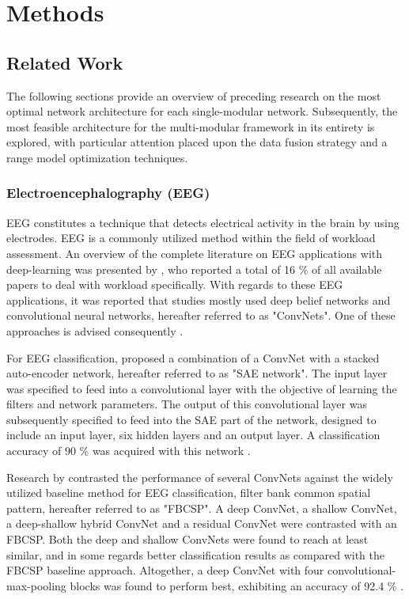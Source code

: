\documentclass[12pt]{article}
\begin{document}
\newpage
\section{Methods}

\subsection{Related Work} 
The following sections provide an overview of preceding research on the most optimal network architecture for each single-modular network. Subsequently, the most feasible architecture for the multi-modular framework in its entirety is explored, with particular attention placed upon the data fusion strategy and a range model optimization techniques.

\subsubsection{Electroencephalography (EEG)}
EEG constitutes a technique that detects electrical activity in the brain by using electrodes. EEG is a commonly utilized method within the field of workload assessment. An overview of the complete literature on EEG applications with deep-learning was presented by , who reported a total of 16 \% of all available papers to deal with workload specifically. With regards to these EEG applications, it was reported that studies mostly used deep belief networks and convolutional neural networks, hereafter referred to as "ConvNets". One of these approaches is advised consequently \cite{craik2019deep}.

For EEG classification,  proposed a combination of a ConvNet with a stacked auto-encoder network, hereafter referred to as "SAE network". The input layer was specified to feed into a convolutional layer with the objective of learning the filters and network parameters. The output of this convolutional layer was subsequently specified to feed into the SAE part of the network, designed to include an input layer, six hidden layers and an output layer. A classification accuracy of 90 \% was acquired with this network \cite{tabar2016novel}. 

Research by  contrasted the performance of several ConvNets against the widely utilized baseline method for EEG classification, filter bank common spatial pattern, hereafter referred to as "FBCSP". A deep ConvNet, a shallow ConvNet, a deep-shallow hybrid ConvNet and a residual ConvNet were contrasted with an FBCSP. Both the deep and shallow ConvNets were found to reach at least similar, and in some regards better classification results as compared with the FBCSP baseline approach. Altogether, a deep ConvNet with four convolutional-max-pooling blocks was found to perform best, exhibiting an accuracy of 92.4 \% \cite{schirrmeister2017deep}.
\end{document}

